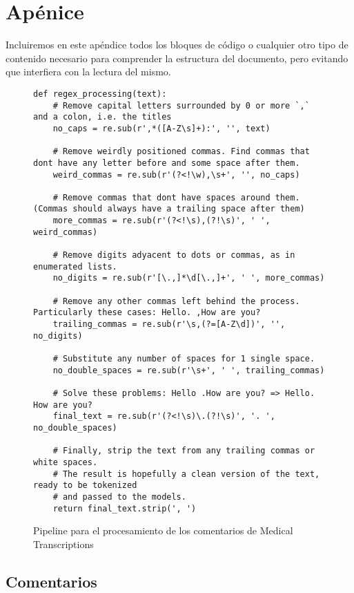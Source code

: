 \appendix
\chapter{Apénice}

Incluiremos en este apéndice todos los bloques de código o cualquier otro tipo de contenido necesario para comprender la estructura del documento, pero evitando que interfiera con la lectura del mismo.

\begin{figure}[h]
	\centering
	
	\begin{verbatim}
def regex_processing(text):
    # Remove capital letters surrounded by 0 or more `,` and a colon, i.e. the titles
    no_caps = re.sub(r',*([A-Z\s]+):', '', text)

    # Remove weirdly positioned commas. Find commas that dont have any letter before and some space after them.
    weird_commas = re.sub(r'(?<!\w),\s+', '', no_caps)
    
    # Remove commas that dont have spaces around them. (Commas should always have a trailing space after them)
    more_commas = re.sub(r'(?<!\s),(?!\s)', ' ', weird_commas)

    # Remove digits adyacent to dots or commas, as in enumerated lists.
    no_digits = re.sub(r'[\.,]*\d[\.,]+', ' ', more_commas)

    # Remove any other commas left behind the process. Particularly these cases: Hello. ,How are you?
    trailing_commas = re.sub(r'\s,(?=[A-Z\d])', '', no_digits)

    # Substitute any number of spaces for 1 single space.
    no_double_spaces = re.sub(r'\s+', ' ', trailing_commas)

    # Solve these problems: Hello .How are you? => Hello. How are you?
    final_text = re.sub(r'(?<!\s)\.(?!\s)', '. ', no_double_spaces)

    # Finally, strip the text from any trailing commas or white spaces.
    # The result is hopefully a clean version of the text, ready to be tokenized
    # and passed to the models.
    return final_text.strip(', ')
	\end{verbatim}

	\caption{Pipeline para el procesamiento de los comentarios de Medical Transcriptions}
	\label{code:pipeline-regex-mdtr}
\end{figure}


\section{Comentarios}
\label{sec:comments}

